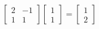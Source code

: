 \documentclass[preview]{standalone}
\begin{document}
\begin{align*}
\begin{bmatrix} 2 & -1 \\ 1 & 1 \end{bmatrix} \begin{bmatrix} 1 \\ 1 \end{bmatrix} = \begin{bmatrix} 1 \\ 2 \end{bmatrix}
\end{align*}
\end{document}
